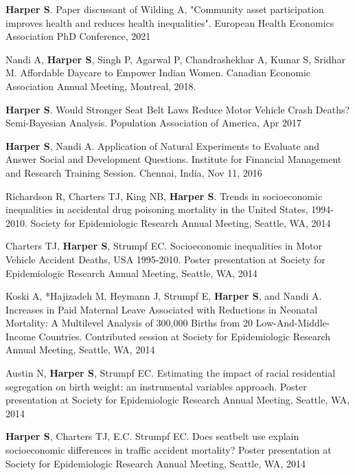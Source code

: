 \documentclass[
  letterpaper,
  DIV=11,
  numbers=noendperiod]{scrartcl}
\begin{document}
\begin{etaremune}

\item \textbf{Harper S}. Paper discussant of Wilding A, "Community asset participation improves health and reduces health inequalities". European Health Economics Association PhD Conference, 2021

\item Nandi A, \textbf{Harper S}, Singh P, Agarwal P, Chandrashekhar A, Kumar S, Sridhar M. Affordable Daycare to Empower Indian Women. Canadian Economic Association Annual Meeting, Montreal, 2018.

\item \textbf{Harper S}. Would Stronger Seat Belt Laws Reduce Motor Vehicle Crash Deaths? Semi-Bayesian Analysis. Population
Association of America, Apr 2017

\item \textbf{Harper S}, Nandi A. Application of Natural Experiments to Evaluate and Answer Social and Development Questions. Institute for Financial Management and Research Training Session. Chennai, India, Nov 11, 2016

\item   *Richardson R, Charters TJ, King NB, \textbf{Harper S}. Trends in socioeconomic inequalities in accidental drug poisoning mortality in the United States, 1994-2010. Society for Epidemiologic Research Annual Meeting, Seattle, WA, 2014

\item   Charters TJ, \textbf{Harper S}, Strumpf EC. Socioeconomic inequalities in Motor Vehicle Accident Deaths, USA 1995-2010. Poster presentation at Society for Epidemiologic Research Annual Meeting, Seattle, WA, 2014

\item   *Koski A, *Hajizadeh M, Heymann J, Strumpf E, \textbf{Harper S}, and Nandi A. Increases in Paid Maternal Leave Associated with Reductions in Neonatal Mortality: A Multilevel Analysis of 300,000 Births from 20 Low-And-Middle-Income Countries. Contributed session at Society for Epidemiologic Research Annual Meeting, Seattle, WA, 2014

\item   *Austin N, \textbf{Harper S}, Strumpf EC. Estimating the impact of racial residential segregation on birth weight: an instrumental variables approach. Poster presentation at Society for Epidemiologic Research Annual Meeting, Seattle, WA, 2014

\item   \textbf{Harper S}, Charters TJ, E.C. Strumpf EC. Does seatbelt use explain socioeconomic differences in traffic accident mortality? Poster presentation at Society for Epidemiologic Research Annual Meeting, Seattle, WA, 2014


\end{etaremune}
\end{document}

